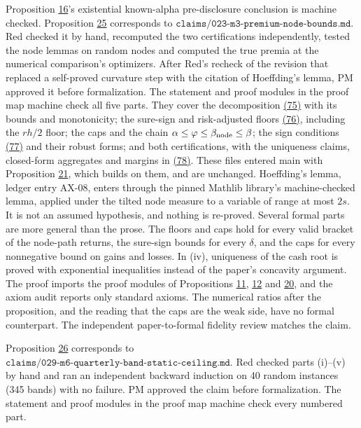 \documentclass[11pt]{article}
\begin{document}
Proposition \hyperref[res:Proposition-16]{16}'s existential known-alpha pre-disclosure conclusion is machine checked.
Proposition \hyperref[res:Proposition-25]{25} corresponds to
\(\texttt{claims/023-m3-premium-node-bounds.md}\). Red checked it by
hand, recomputed the two certifications independently, tested the
node lemmas on random nodes and computed the true premia at the
numerical comparison's optimizers. After Red's recheck of the revision
that replaced a self-proved curvature step with the citation of
Hoeffding's lemma, PM approved it before formalization. The
statement and proof modules in the proof map machine check all five
parts. They cover the decomposition \hyperref[eq:75]{(75)} with its bounds and
monotonicity; the sure-sign and risk-adjusted floors \hyperref[eq:76]{(76)}, including
the \(rh/2\) floor; the caps and the chain
\(\alpha\leq\varphi\leq\beta_{\rm node}\leq\beta\); the sign conditions
\hyperref[eq:77]{(77)} and their robust forms; and both certifications, with the
uniqueness claims, closed-form aggregates and margins in \hyperref[eq:78]{(78)}. These
files entered main with Proposition \hyperref[res:Proposition-21]{21}, which builds on them, and are
unchanged. Hoeffding's lemma, ledger entry AX-08, enters through the
pinned Mathlib library's machine-checked lemma, applied under the
tilted node measure to a variable of range at most \(2s\). It is not
an assumed hypothesis, and nothing is re-proved. Several formal parts
are more general than the prose. The floors and caps hold for every
valid bracket of the node-path returns, the sure-sign bounds for every
\(\delta\), and the caps for every nonnegative bound on gains and
losses. In (iv), uniqueness of the cash root is proved with exponential
inequalities instead of the paper's concavity argument. The proof
imports the proof modules of Propositions \hyperref[res:Proposition-11]{11}, \hyperref[res:Proposition-12]{12} and \hyperref[res:Proposition-20]{20}, and the axiom
audit reports only standard axioms. The numerical ratios after the
proposition, and the reading that the caps are the weak side, have no
formal counterpart. The independent paper-to-formal fidelity review
matches the claim.

Proposition \hyperref[res:Proposition-26]{26} corresponds to
\(\texttt{claims/029-m6-quarterly-band-static-ceiling.md}\). Red
checked parts (i)--(v) by hand and ran an independent backward
induction on 40 random instances (345 bands) with no failure. PM
approved the claim before formalization. The statement and proof
modules in the proof map machine check every numbered part.
\end{document}
